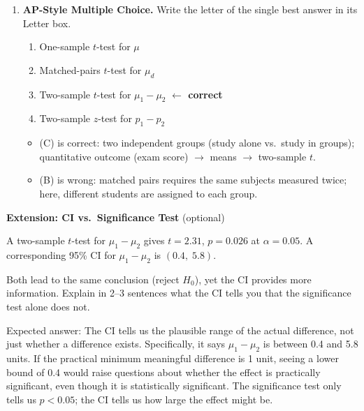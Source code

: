\documentclass[10pt]{article}
\begin{document}
\begin{enumerate}
\vspace{0.10in}

\item \textbf{AP-Style Multiple Choice.} Write the letter of the single best answer in its Letter box.

      \begin{enumerate}[label=(\Alph*)]
        \item One-sample $t$-test for $\mu$
        \item Matched-pairs $t$-test for $\mu_d$
        \item Two-sample $t$-test for $\mu_1 - \mu_2$ \textcolor{keyred}{\textbf{$\leftarrow$ correct}}
        \item Two-sample $z$-test for $p_1 - p_2$
              \hfill{}
      \end{enumerate}
      \begin{itemize}
        \item (C) is correct: two independent groups (study alone vs.\ study in groups); quantitative outcome (exam score) $\to$ means $\to$ two-sample $t$.
        \item (B) is wrong: matched pairs requires the same subjects measured twice; here, different students are assigned to each group.
      \end{itemize}

\end{enumerate}

\begin{extensionbox}
\textbf{Extension: CI vs.\ Significance Test} (optional)

A two-sample $t$-test for $\mu_1 - \mu_2$ gives $t = 2.31$, $p = 0.026$ at $\alpha = 0.05$.
A corresponding 95\% CI for $\mu_1 - \mu_2$ is $(0.4,\; 5.8)$.

Both lead to the same conclusion (reject $H_0$), yet the CI provides more information. Explain
in 2--3 sentences what the CI tells you that the significance test alone does not.

\begin{teachernote}
Expected answer: The CI tells us the plausible range of the actual difference, not just
whether a difference exists. Specifically, it says $\mu_1 - \mu_2$ is between 0.4 and 5.8
units. If the practical minimum meaningful difference is 1 unit, seeing a lower bound of 0.4
would raise questions about whether the effect is practically significant, even though it is
statistically significant. The significance test only tells us $p < 0.05$; the CI tells us how large the effect might be.
\end{teachernote}
\end{extensionbox}
\end{document}
